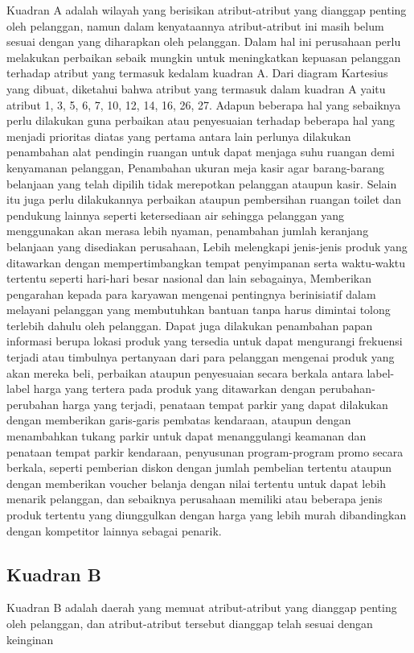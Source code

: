 Kuadran A adalah wilayah yang berisikan atribut-atribut yang dianggap penting oleh pelanggan, namun dalam kenyataannya atribut-atribut ini masih belum sesuai
dengan yang diharapkan oleh pelanggan. Dalam hal ini perusahaan perlu melakukan perbaikan sebaik mungkin untuk meningkatkan kepuasan pelanggan terhadap
atribut yang termasuk kedalam kuadran A. Dari diagram Kartesius yang dibuat, diketahui bahwa atribut yang termasuk dalam kuadran A yaitu atribut 1, 3, 5, 6, 7,
10, 12, 14, 16, 26, 27.
Adapun beberapa hal yang sebaiknya perlu dilakukan guna perbaikan atau penyesuaian terhadap beberapa hal yang menjadi prioritas diatas yang pertama antara lain
perlunya dilakukan penambahan alat pendingin ruangan untuk dapat menjaga suhu ruangan demi kenyamanan pelanggan, Penambahan ukuran meja kasir agar barang-barang belanjaan yang telah dipilih
tidak merepotkan pelanggan ataupun kasir. Selain itu juga perlu dilakukannya perbaikan ataupun pembersihan ruangan toilet dan pendukung lainnya seperti ketersediaan air
sehingga pelanggan yang menggunakan akan merasa lebih nyaman, penambahan jumlah keranjang belanjaan yang disediakan perusahaan, Lebih melengkapi jenis-jenis
produk yang ditawarkan dengan mempertimbangkan tempat penyimpanan serta waktu-waktu tertentu seperti hari-hari besar nasional dan lain sebagainya, Memberikan pengarahan kepada para
karyawan mengenai pentingnya berinisiatif dalam melayani pelanggan yang membutuhkan bantuan tanpa harus dimintai tolong terlebih dahulu oleh pelanggan.
Dapat juga dilakukan penambahan papan informasi berupa lokasi produk yang tersedia untuk dapat mengurangi frekuensi terjadi atau timbulnya pertanyaan dari para
pelanggan mengenai produk yang akan mereka beli, perbaikan ataupun penyesuaian secara berkala antara label-label harga yang tertera pada produk yang ditawarkan dengan perubahan-perubahan
harga yang terjadi, penataan tempat parkir yang dapat dilakukan dengan memberikan garis-garis pembatas kendaraan, ataupun dengan menambahkan tukang parkir untuk
dapat menanggulangi keamanan dan penataan tempat parkir kendaraan, penyusunan program-program promo secara berkala, seperti pemberian diskon dengan jumlah pembelian tertentu ataupun dengan
memberikan voucher belanja dengan nilai tertentu untuk dapat lebih menarik pelanggan, dan sebaiknya perusahaan memiliki atau beberapa jenis produk tertentu
yang diunggulkan dengan harga yang lebih murah dibandingkan dengan kompetitor lainnya sebagai penarik.
\subsection{Kuadran B}
Kuadran B adalah daerah yang memuat atribut-atribut yang dianggap penting oleh pelanggan, dan atribut-atribut tersebut dianggap telah sesuai dengan keinginan


